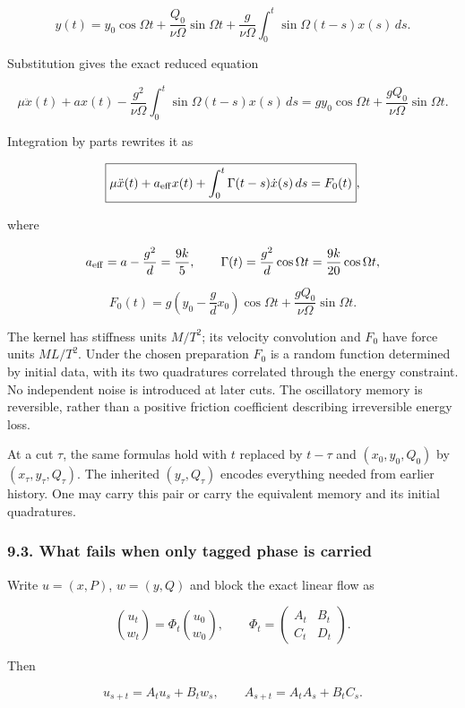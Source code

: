 \documentclass[11pt,a4paper]{article}
\begin{document}
\[
y(t)=y_0\cos\Omega t+\frac{Q_0}{\nu\Omega}\sin\Omega t
 +\frac{g}{\nu\Omega}\int_0^t\sin\Omega(t-s)x(s)\,ds.
\]

Substitution gives the exact reduced equation

\[
\mu\ddot x(t)+ax(t)
-\frac{g^2}{\nu\Omega}\int_0^t\sin\Omega(t-s)x(s)\,ds
=g y_0\cos\Omega t+\frac{gQ_0}{\nu\Omega}\sin\Omega t.
\]

Integration by parts rewrites it as

\[
\boxed{\mu\ddot x(t)+a_{\rm eff}x(t)
 +\int_0^t\Gamma(t-s)\dot x(s)\,ds=F_0(t)},
\]

where

\[
a_{\rm eff}=a-\frac{g^2}{d}=\frac{9k}{5},\qquad
\Gamma(t)=\frac{g^2}{d}\cos\Omega t=\frac{9k}{20}\cos\Omega t,
\]

\[
F_0(t)=g\left(y_0-\frac gd x_0\right)\cos\Omega t
 +\frac{gQ_0}{\nu\Omega}\sin\Omega t.
\]

The kernel has stiffness units \(M/T^2\); its velocity convolution and
\(F_0\) have force units \(ML/T^2\). Under the chosen preparation
\(F_0\) is a random function determined by initial data, with its two
quadratures correlated through the energy constraint. No independent
noise is introduced at later cuts. The oscillatory memory is reversible,
rather than a positive friction coefficient describing irreversible
energy loss.

At a cut \(\tau\), the same formulas hold with \(t\) replaced by
\(t-\tau\) and \((x_0,y_0,Q_0)\) by \((x_\tau,y_\tau,Q_\tau)\). The
inherited \((y_\tau,Q_\tau)\) encodes everything needed from earlier
history. One may carry this pair or carry the equivalent memory and its
initial quadratures.

\hypertarget{what-fails-when-only-tagged-phase-is-carried}{%
\subsubsection{9.3. What fails when only tagged phase is
carried}\label{what-fails-when-only-tagged-phase-is-carried}}

Write \(u=(x,P)\), \(w=(y,Q)\) and block the exact linear flow as

\[\binom{u_t}{w_t}
=\Phi_t\binom{u_0}{w_0},\qquad
\Phi_t=\begin{pmatrix}A_t&B_t\\C_t&D_t\end{pmatrix}.\]

Then

\[u_{s+t}=A_tu_s+B_tw_s,\qquad
A_{s+t}=A_tA_s+B_tC_s.\]
\end{document}
